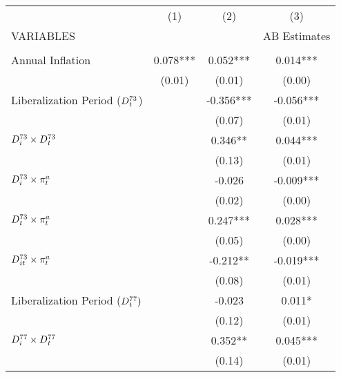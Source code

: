 \begin{tabular}{lccc} \hline
 & (1) & (2) & (3) \\
VARIABLES &  &  & AB Estimates \\ \hline
 &  &  &  \\
Annual Inflation & 0.078*** & 0.052*** & 0.014*** \\
 & (0.01) & (0.01) & (0.00) \\
Liberalization Period ($\vspace{0pt}D\vspace{0pt}_t^{73}\vspace{0pt}$) &  & -0.356*** & -0.056*** \\
 &  & (0.07) & (0.01) \\
$\vspace{0pt} D_i^{73}\times \vspace{0pt}D\vspace{0pt}_t^{73}\vspace{0pt}$ &  & 0.346** & 0.044*** \\
 &  & (0.13) & (0.01) \\
$\vspace{0pt}D_i^{73} \vspace{0pt}\times \pi_t^a $ &  & -0.026 & -0.009*** \\
 &  & (0.02) & (0.00) \\
$\vspace{0pt}D\vspace{0pt}_t^{73}\vspace{0pt}\times \pi_t^a $ &  & 0.247*** & 0.028*** \\
 &  & (0.05) & (0.00) \\
$\vspace{0pt}D\vspace{0pt}_{it}^{73}\times \pi_t^a $ &  & -0.212** & -0.019*** \\
 &  & (0.08) & (0.01) \\
Liberalization Period ($\vspace{0pt}D\vspace{0pt}_t^{77}\vspace{0pt})$ &  & -0.023 & 0.011* \\
 &  & (0.12) & (0.01) \\
$\vspace{0pt} D_i^{77}\times \vspace{0pt}D\vspace{0pt}_t^{77}\vspace{0pt}$ &  & 0.352** & 0.045*** \\
 &  & (0.14) & (0.01) \\

\end{tabular}
